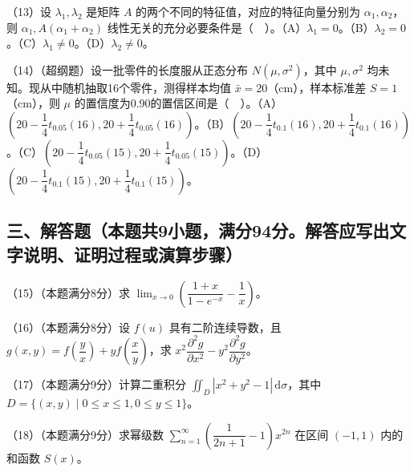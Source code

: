 \documentclass[UTF8,12pt]{ctexart}
\begin{document}
（13）设 \(\displaystyle \lambda_1,\allowbreak \lambda_2\) 是矩阵 \(\displaystyle A\) 的两个不同的特征值，对应的特征向量分别为 \(\displaystyle \alpha_1,\allowbreak \alpha_2\)，则 \(\displaystyle \alpha_1,\allowbreak A(\alpha_1+\alpha_2)\) 线性无关的充分必要条件是（　）。（A）\(\displaystyle \lambda_1=0\)。（B）\(\displaystyle \lambda_2=0\)。（C）\(\displaystyle \lambda_1\ne0\)。（D）\(\displaystyle \lambda_2\ne0\)。


（14）（超纲题）设一批零件的长度服从正态分布 \(\displaystyle N(\mu,\allowbreak \sigma^2)\)，其中 \(\displaystyle \mu,\allowbreak \sigma^2\) 均未知。现从中随机抽取16个零件，测得样本均值 \(\displaystyle \bar x=20\)（cm），样本标准差 \(\displaystyle S=1\)（cm），则 \(\displaystyle \mu\) 的置信度为0.90的置信区间是（　）。（A）\(\displaystyle (20-\dfrac{\displaystyle 1}{\displaystyle 4}t_{0.05}(16),\allowbreak 20+\dfrac{\displaystyle 1}{\displaystyle 4}t_{0.05}(16))\)。（B）\(\displaystyle (20-\dfrac{\displaystyle 1}{\displaystyle 4}t_{0.1}(16),\allowbreak 20+\dfrac{\displaystyle 1}{\displaystyle 4}t_{0.1}(16))\)。（C）\(\displaystyle (20-\dfrac{\displaystyle 1}{\displaystyle 4}t_{0.05}(15),\allowbreak 20+\dfrac{\displaystyle 1}{\displaystyle 4}t_{0.05}(15))\)。（D）\(\displaystyle (20-\dfrac{\displaystyle 1}{\displaystyle 4}t_{0.1}(15),\allowbreak 20+\dfrac{\displaystyle 1}{\displaystyle 4}t_{0.1}(15))\)。


\subsection*{三、解答题（本题共9小题，满分94分。解答应写出文字说明、证明过程或演算步骤）}

（15）（本题满分8分）求 \(\displaystyle \lim_{x\to0}\left(\dfrac{\displaystyle 1+x}{\displaystyle 1-e^{-x}}-\dfrac{\displaystyle 1}{\displaystyle x}\right)\)。


（16）（本题满分8分）设 \(\displaystyle f(u)\) 具有二阶连续导数，且 \(\displaystyle g(x,\allowbreak y)=f(\dfrac{\displaystyle y}{\displaystyle x})+yf(\dfrac{\displaystyle x}{\displaystyle y})\)，求 \(\displaystyle x^2\dfrac{\displaystyle \partial^2g}{\displaystyle \partial x^2}-y^2\dfrac{\displaystyle \partial^2g}{\displaystyle \partial y^2}\)。


（17）（本题满分9分）计算二重积分 \(\displaystyle \iint_D|x^2+y^2-1|\,\mathrm d\sigma\)，其中 \(\displaystyle D=\{(x,\allowbreak y)\mid0\le x\le1,\allowbreak 0\le y\le1\}\)。


（18）（本题满分9分）求幂级数 \(\displaystyle \sum_{n=1}^{\infty}(\dfrac{\displaystyle 1}{\displaystyle 2n+1}-1)x^{2n}\) 在区间 \(\displaystyle (-1,\allowbreak 1)\) 内的和函数 \(\displaystyle S(x)\)。
\end{document}
